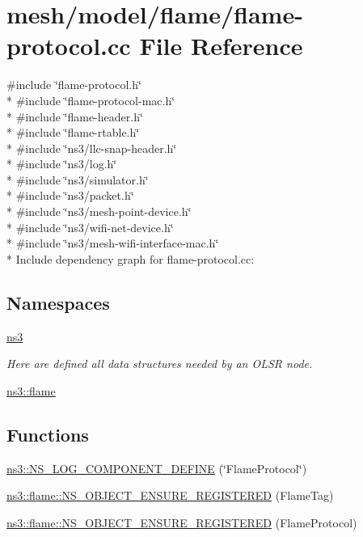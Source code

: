 \hypertarget{flame-protocol_8cc}{}\section{mesh/model/flame/flame-\/protocol.cc File Reference}
\label{flame-protocol_8cc}
{\ttfamily \#include \char`\"{}flame-\/protocol.\+h\char`\"{}}\\*
{\ttfamily \#include \char`\"{}flame-\/protocol-\/mac.\+h\char`\"{}}\\*
{\ttfamily \#include \char`\"{}flame-\/header.\+h\char`\"{}}\\*
{\ttfamily \#include \char`\"{}flame-\/rtable.\+h\char`\"{}}\\*
{\ttfamily \#include \char`\"{}ns3/llc-\/snap-\/header.\+h\char`\"{}}\\*
{\ttfamily \#include \char`\"{}ns3/log.\+h\char`\"{}}\\*
{\ttfamily \#include \char`\"{}ns3/simulator.\+h\char`\"{}}\\*
{\ttfamily \#include \char`\"{}ns3/packet.\+h\char`\"{}}\\*
{\ttfamily \#include \char`\"{}ns3/mesh-\/point-\/device.\+h\char`\"{}}\\*
{\ttfamily \#include \char`\"{}ns3/wifi-\/net-\/device.\+h\char`\"{}}\\*
{\ttfamily \#include \char`\"{}ns3/mesh-\/wifi-\/interface-\/mac.\+h\char`\"{}}\\*
Include dependency graph for flame-\/protocol.cc\+:
\subsection*{Namespaces}
\begin{DoxyCompactItemize}
\item 
 \hyperlink{namespacens3}{ns3}
\begin{DoxyCompactList}\small\item\em Here are defined all data structures needed by an O\+L\+SR node. \end{DoxyCompactList}\item 
 \hyperlink{namespacens3_1_1flame}{ns3\+::flame}
\end{DoxyCompactItemize}
\subsection*{Functions}
\begin{DoxyCompactItemize}
\item 
\hyperlink{namespacens3_a0251d6f4f92ad57e1a912b27acdd8cfe}{ns3\+::\+N\+S\+\_\+\+L\+O\+G\+\_\+\+C\+O\+M\+P\+O\+N\+E\+N\+T\+\_\+\+D\+E\+F\+I\+NE} (\char`\"{}Flame\+Protocol\char`\"{})
\item 
\hyperlink{namespacens3_1_1flame_ae4125fe7c0682de529686e4c1bdef070}{ns3\+::flame\+::\+N\+S\+\_\+\+O\+B\+J\+E\+C\+T\+\_\+\+E\+N\+S\+U\+R\+E\+\_\+\+R\+E\+G\+I\+S\+T\+E\+R\+ED} (Flame\+Tag)
\item 
\hyperlink{namespacens3_1_1flame_ac58feec63a0d8e7dd583ad970c114b93}{ns3\+::flame\+::\+N\+S\+\_\+\+O\+B\+J\+E\+C\+T\+\_\+\+E\+N\+S\+U\+R\+E\+\_\+\+R\+E\+G\+I\+S\+T\+E\+R\+ED} (Flame\+Protocol)
\end{DoxyCompactItemize}
